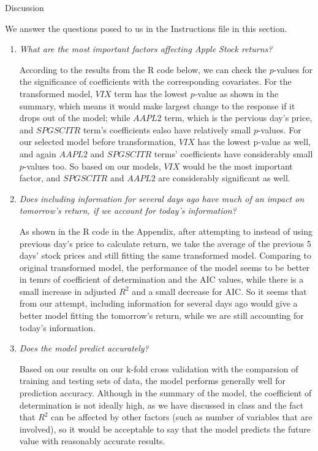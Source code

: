 \documentclass[]{article}
\begin{document}
\begin{section}{Discussion}

We answer the questions posed to us in the Instructions file in this section.

\begin{enumerate}
\item{}
\textit {What are the most important factors affecting Apple Stock returns?}

According to the results from the R code below, we can check the $p$-values for the significance of coefficients with the corresponding covariates. For the transformed model, $VIX$ term has the lowest $p$-value as shown in the summary, which means it would make largest change to the response if it drops out of the model; while $AAPL2$ term, which is the pervious day's price, and $SPGSCITR$ term's coefficients ealso have relatively small $p$-values. For our selected model before transformation, $VIX$ has the lowest p-value as well, and again $AAPL2$ and $SPGSCITR$ terms' coefficients have considerably small $p$-values too.  So based on our models, $VIX$ would be the most important factor, and $SPGSCITR$ and $AAPL2$ are considerably significant as well. 

\item{}
\textit {Does including information for several days ago have much of an impact on tomorrow’s return, if we account for today’s information?}

As shown in the R code in the Appendix, after attempting to instead of using previous day's price to calculate return, we take the average of the previous 5 days' stock prices and still fitting the same transformed model. Comparing to original transformed model, the performance of the model seems to be better in temrs of coefficient of determination and the AIC values, while there is a small increase in adjusted $R^2$ and a small decrease for AIC. So it seems that from our attempt, including information for several days ago would give a better model fitting the tomorrow's return, while we are still accounting for today's information.

\item{}
\textit {Does the model predict accurately?}

Based on our results on our k-fold cross validation with the comparsion of training and testing sets of data, the model performs generally well for prediction accuracy. Although in the summary of the model, the coefficient of determination is not ideally high, as we have discussed in class and the fact that $R^2$ can be affected by other factors (such as number of variables that are involved), so it would be acceptable to say that the model predicts the future value with reasonably accurate results. 


\end{enumerate}
\end{section}
\end{document}
